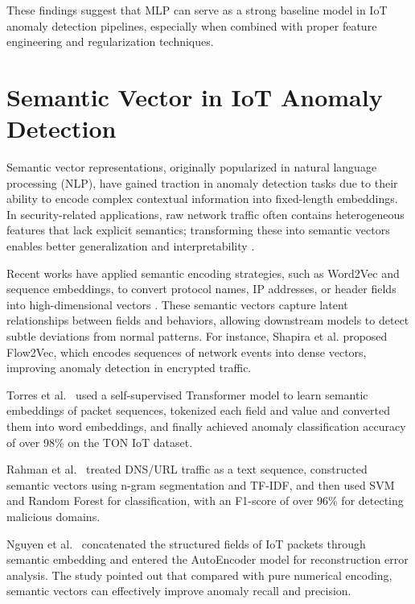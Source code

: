 \begin{ZhChapter}
    These findings suggest that MLP can serve as a strong baseline model in IoT anomaly detection pipelines, especially when combined with proper feature engineering and regularization techniques.



    \section{Semantic Vector in IoT Anomaly Detection}
    Semantic vector representations, originally popularized in natural language processing (NLP), have gained traction in anomaly detection tasks due to their ability to encode complex contextual information into fixed-length embeddings. In security-related applications, raw network traffic often contains heterogeneous features that lack explicit semantics; transforming these into semantic vectors enables better generalization and interpretability \cite{mikolov2013distributed}.


    Recent works have applied semantic encoding strategies, such as Word2Vec and sequence embeddings, to convert protocol names, IP addresses, or header fields into high-dimensional vectors \cite{li2020embedding}. These semantic vectors capture latent relationships between fields and behaviors, allowing downstream models to detect subtle deviations from normal patterns. For instance, Shapira et al. \cite{shapira2021flow} proposed Flow2Vec, which encodes sequences of network events into dense vectors, improving anomaly detection in encrypted traffic.


    Torres et al.~\cite{torres2022iotbert} used a self-supervised Transformer model to learn semantic embeddings of packet sequences, tokenized each field and value and converted them into word embeddings, and finally achieved anomaly classification accuracy of over 98\% on the TON IoT dataset.


    Rahman et al.~\cite{gokstorp2024anomaly} treated DNS/URL traffic as a text sequence, constructed semantic vectors using n-gram segmentation and TF-IDF, and then used SVM and Random Forest for classification, with an F1-score of over 96\% for detecting malicious domains.

    Nguyen et al.~\cite{hariharan2023detecting} concatenated the structured fields of IoT packets through semantic embedding and entered the AutoEncoder model for reconstruction error analysis. The study pointed out that compared with pure numerical encoding, semantic vectors can effectively improve anomaly recall and precision.



\end{ZhChapter}
